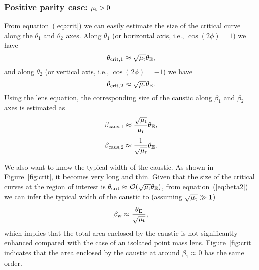 \documentclass[showpacs,twocolumn,preprintnumbers,amsmath,amssymb,superscriptaddress,nofootinbib]{revtex4}
\begin{document}
\subsubsection{Positive parity case: $\mu_{\rm t}>0$}

From equation~(\ref{eq:crit}) we can easily estimate the size of the
critical curve along the $\theta_1$ and $\theta_2$ axes. Along $\theta_1$
(or horizontal axis, i.e., $\cos(2\phi)=1$) we have
\begin{equation}
\theta_{\rm crit,1}\approx \sqrt{\mu_{\rm t}}\theta_{\rm E},
\end{equation}
and along $\theta_2$ (or vertical axis, i.e., $\cos(2\phi)=-1$) we have
\begin{equation}
\theta_{\rm crit,2}\approx \sqrt{\mu_{\rm r}}\theta_{\rm E}.
\end{equation}
Using the lens equation, the corresponding size of the caustic along
$\beta_1$ and $\beta_2$ axes is estimated as
\begin{equation}
\beta_{\rm caus,1}\approx \frac{\sqrt{\mu_{\rm t}}}{\mu_{\rm r}}\theta_{\rm E},
\label{eq:betaplus}
\end{equation}
\begin{equation}
\beta_{\rm caus,2}\approx \frac{1}{\sqrt{\mu_{\rm r}}}\theta_{\rm E}.
\end{equation}

We also want to know the typical width of the caustic. As shown in
Figure~\ref{fig:crit}, it becomes very long and thin. Given that the
size of the critical curves at the region of interest is $\theta_{\rm
  crit}\approx \mathcal{O}(\sqrt{\mu_{\rm t}}\theta_{\rm E})$, from
equation~(\ref{eq:beta2}) we can infer the typical width of the
caustic to (assuming $\sqrt{\mu_{\rm t}}\gg 1$) 
\begin{equation}
\beta_{\rm w}\approx \frac{\theta_{\rm E}}{\sqrt{\mu_{\rm t}}},
\label{eq:deltabeta}
\end{equation}
which implies that the total area enclosed by the caustic is not
significantly enhanced compared with the case of an isolated point
mass lens. Figure~\ref{fig:crit} indicates that the area enclosed by
the caustic at around $\beta_1\approx 0$ has the same order.

\end{document}
